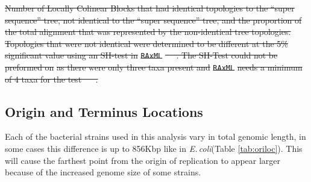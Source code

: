 \documentclass[11pt]{article}
\newcommand{\smel}{\textit{S.\,meliloti}\xspace}
\newcommand{\strep}{\textit{Streptomyces}\xspace}
\newcommand{\ecol}{\textit{E.\,coli}\xspace}
\newcommand{\bass}{\textit{B.\,subtilis}\xspace}
\newcommand{\pa}{pSymA\xspace}
\newcommand{\pb}{pSymB\xspace}
\providecommand{\DIFdeltex}[1]{{\protect\color{red}\sout{#1}}}                      %
\providecommand{\DIFdelbegin}{} %
\providecommand{\DIFdelend}{} %
\providecommand{\DIFdel}[1]{\texorpdfstring{\DIFdeltex{#1}}{}} %
\begin{document}
	
	\DIFdelbegin %
{%
\DIFdel{Number of Locally Colinear Blocks that had identical topologies to the ``super sequence'' tree, not identical to the ``super sequence'' tree, and the proportion of the total alignment that was represented by the non-identical tree topologies. Topologies that were not identical were determined to be different at the 5\% significant value using an SH-test in }\texttt{\DIFdel{RAxML}} %
\DIFdel{\mbox{%
\citep{stamatakis2014raxml}
}%
. The SH-Test could not be preformed on }%
\DIFdel{as there were only three taxa present and }\texttt{\DIFdel{RAxML}} %
\DIFdel{needs a minimum of 4 taxa for the test  \mbox{%
\citep{stamatakis2014raxml}
}%
.}}

\DIFdelend \subsection{Origin and Terminus Locations}

Each of the bacterial strains used in this analysis vary in total genomic length, in some cases this difference is up to 856Kbp like in \ecol (Table \ref{tab:oriloc}). 
This will cause the farthest point from the origin of replication to appear larger because of the increased genome size of some strains.
\end{document}
